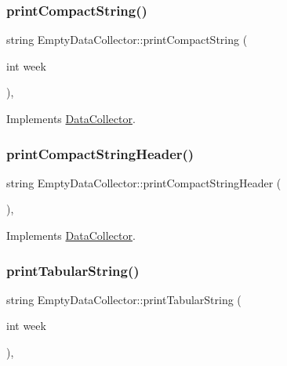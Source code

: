\subsubsection{\texorpdfstring{print\+Compact\+String()}{printCompactString()}}
{\footnotesize\ttfamily string Empty\+Data\+Collector\+::print\+Compact\+String (\begin{DoxyParamCaption}\item[{int}]{week }\end{DoxyParamCaption})\hspace{0.3cm}{\ttfamily [override]}, {\ttfamily [virtual]}}



Implements \mbox{\hyperlink{classDataCollector_a2eac264fa5612aed5a830b12de4f4ae3}{Data\+Collector}}.

\mbox{\label{classEmptyDataCollector_a345d478e92af2ab4bcbaeeae3c7a3faa}} 
\subsubsection{\texorpdfstring{print\+Compact\+String\+Header()}{printCompactStringHeader()}}
{\footnotesize\ttfamily string Empty\+Data\+Collector\+::print\+Compact\+String\+Header (\begin{DoxyParamCaption}{ }\end{DoxyParamCaption})\hspace{0.3cm}{\ttfamily [override]}, {\ttfamily [virtual]}}



Implements \mbox{\hyperlink{classDataCollector_a98dcb4ec871d9c7fbf7545c64e5ccc67}{Data\+Collector}}.

\mbox{\label{classEmptyDataCollector_a2bb44e454376ed518c4d89cf324b8bd7}} 
\subsubsection{\texorpdfstring{print\+Tabular\+String()}{printTabularString()}}
{\footnotesize\ttfamily string Empty\+Data\+Collector\+::print\+Tabular\+String (\begin{DoxyParamCaption}\item[{int}]{week }\end{DoxyParamCaption})\hspace{0.3cm}{\ttfamily [override]}, {\ttfamily [virtual]}}



